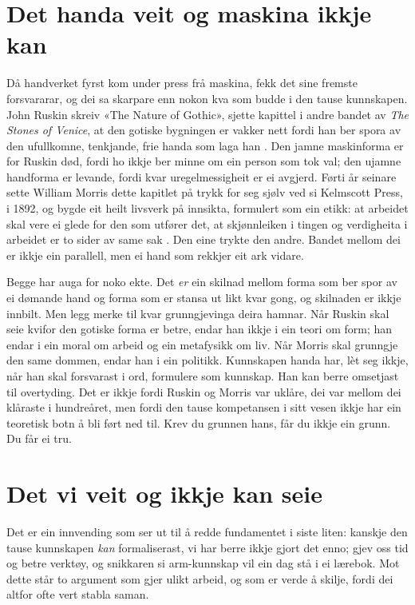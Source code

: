 \section{Det handa veit og maskina ikkje kan}

Då handverket fyrst kom under press frå maskina, fekk det sine fremste forsvararar, og dei sa skarpare enn nokon kva som budde i den tause kunnskapen. John Ruskin skreiv «The Nature of Gothic», sjette kapittel i andre bandet av \textit{The Stones of Venice}, at den gotiske bygningen er vakker nett fordi han ber spora av den ufullkomne, tenkjande, frie handa som laga han \autocite{ruskin1853stones}. Den jamne maskinforma er for Ruskin død, fordi ho ikkje ber minne om ein person som tok val; den ujamne handforma er levande, fordi kvar uregelmessigheit er ei avgjerd. Førti år seinare sette William Morris dette kapitlet på trykk for seg sjølv ved si Kelmscott Press, i 1892, og bygde eit heilt livsverk på innsikta, formulert som ein etikk: at arbeidet skal vere ei glede for den som utfører det, at skjønnleiken i tingen og verdigheita i arbeidet er to sider av same sak \autocite{morris1882hopes}. Den eine trykte den andre. Bandet mellom dei er ikkje ein parallell, men ei hand som rekkjer eit ark vidare.

Begge har auga for noko ekte. Det \emph{er} ein skilnad mellom forma som ber spor av ei dømande hand og forma som er stansa ut likt kvar gong, og skilnaden er ikkje innbilt. Men legg merke til kvar grunngjevinga deira hamnar. Når Ruskin skal seie kvifor den gotiske forma er betre, endar han ikkje i ein teori om form; han endar i ein moral om arbeid og ein metafysikk om liv. Når Morris skal grunngje den same dommen, endar han i ein politikk. Kunnskapen handa har, lèt seg ikkje, når han skal forsvarast i ord, formulere som kunnskap. Han kan berre omsetjast til overtyding. Det er ikkje fordi Ruskin og Morris var uklåre, dei var mellom dei klåraste i hundreåret, men fordi den tause kompetansen i sitt vesen ikkje har ein teoretisk botn å bli ført ned til. Krev du grunnen hans, får du ikkje ein grunn. Du får ei tru.

\section{Det vi veit og ikkje kan seie}

Det er ein innvending som ser ut til å redde fundamentet i siste liten: kanskje den tause kunnskapen \emph{kan} formaliserast, vi har berre ikkje gjort det enno; gjev oss tid og betre verktøy, og snikkaren si arm-kunnskap vil ein dag stå i ei lærebok. Mot dette står to argument som gjer ulikt arbeid, og som er verde å skilje, fordi dei altfor ofte vert stabla saman.

